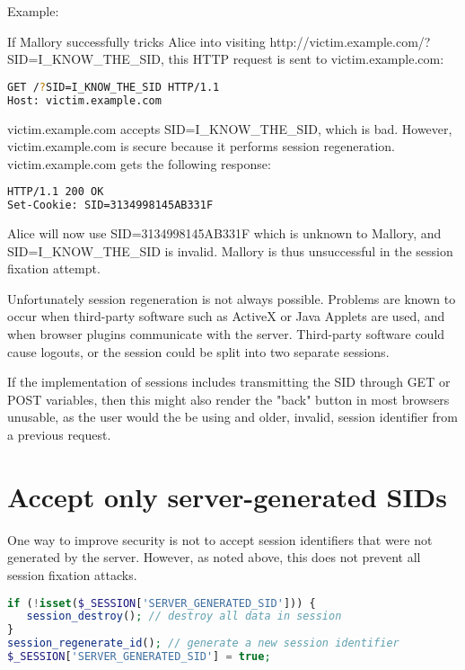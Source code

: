 Example:

If Mallory successfully tricks Alice into visiting http://victim.example.com/?SID=I\_KNOW\_THE\_SID, this HTTP request is sent to victim.example.com:

\begin{lstlisting}[language=bash]
GET /?SID=I_KNOW_THE_SID HTTP/1.1
Host: victim.example.com
\end{lstlisting}

victim.example.com accepts SID=I\_KNOW\_THE\_SID, which is bad. However, victim.example.com is secure because it performs session regeneration. victim.example.com gets the following response:

\begin{lstlisting}[language=bash]
HTTP/1.1 200 OK
Set-Cookie: SID=3134998145AB331F
\end{lstlisting}

Alice will now use SID=3134998145AB331F which is unknown to Mallory, and SID=I\_KNOW\_THE\_SID is invalid. Mallory is thus unsuccessful in the session fixation attempt.

Unfortunately session regeneration is not always possible. Problems are known to occur when third-party software such as ActiveX or Java Applets are used, and when browser plugins communicate with the server. Third-party software could cause logouts, or the session could be split into two separate sessions.

If the implementation of sessions includes transmitting the SID through GET or POST variables, then this might also render the "back" button in most browsers unusable, as the user would the be using and older, invalid, session identifier from a previous request.


\section{Accept only server-generated SIDs}

One way to improve security is not to accept session identifiers that were not generated by the server. However, as noted above, this does not prevent all session fixation attacks.

\begin{lstlisting}[language=PHP]
if (!isset($_SESSION['SERVER_GENERATED_SID'])) {
   session_destroy(); // destroy all data in session
}
session_regenerate_id(); // generate a new session identifier
$_SESSION['SERVER_GENERATED_SID'] = true;
\end{lstlisting}




